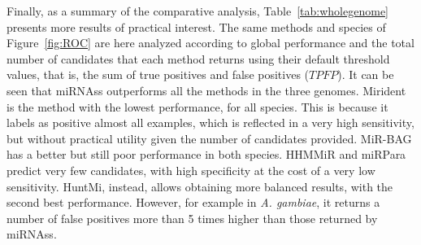 \documentclass{article}
\begin{document}
Finally, as a summary of the comparative analysis, Table~\ref{tab:wholegenome} presents more results of practical interest. The same methods and species of Figure~\ref{fig:ROC} are here analyzed according to global performance and the total number of candidates that each method returns using their default threshold values, that is, the sum of true positives and false positives ($TPFP$). It can be seen that miRNAss outperforms all the methods in the three genomes. Mirident is the method with the lowest performance, for all species. This is because it labels as positive almost all examples, which is reflected in a very high sensitivity, but without practical utility given the number of candidates provided. MiR-BAG has a better but still poor performance in both species. HHMMiR and miRPara predict very few candidates, with high specificity at the cost of a very low sensitivity. HuntMi, instead, allows obtaining more balanced results, with the second best performance. However, for example in \textit{A. gambiae}, it returns a number of false positives more than 5 times higher than those returned by miRNAss.
\end{document}
